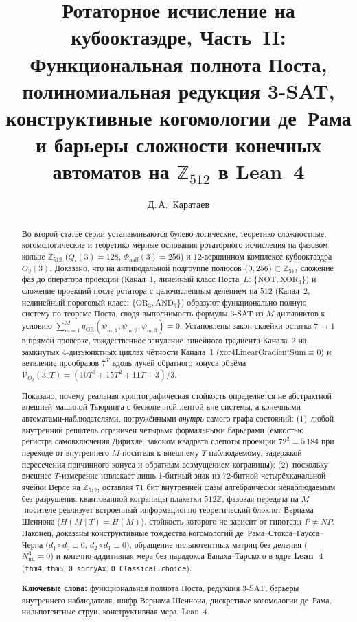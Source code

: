 \documentclass[11pt,a4paper]{article}
\title{\textbf{Ротаторное исчисление на кубооктаэдре, Часть~II:\\ Функциональная полнота Поста, полиномиальная редукция 3-SAT, конструктивные когомологии де~Рама и барьеры сложности конечных автоматов на $\mathbb{Z}_{512}$ в Lean~4}}
\author{Д.\,А.~Каратаев}
\date{}
\theoremstyle{plain}
\theoremstyle{definition}
\begin{document}
\maketitle

\begin{abstract}
Во второй статье серии устанавливаются булево-логические, теоретико-сложностные, когомологические и теоретико-мерные основания ротаторного исчисления на фазовом кольце $\mathbb{Z}_{512}$ ($Q_\square(3)=128$, $\Phi_{\mathrm{half}}(3)=256$) и $12$-вершинном комплексе кубооктаэдра $O_2(3)$. Доказано, что на антиподальной подгруппе полюсов $\{0,256\}\subset\mathbb{Z}_{512}$ сложение фаз до оператора проекции (Канал~1, линейный класс Поста~$L$: $\{\mathrm{NOT},\mathrm{XOR}_3\}$) и сложение проекций после ротатора с целочисленным делением на $512$ (Канал~2, нелинейный пороговый класс: $\{\mathrm{OR}_3,\mathrm{AND}_3\}$) образуют функционально полную систему по теореме Поста, сводя выполнимость формулы 3-SAT из $M$ дизъюнктов к условию $\sum_{m=1}^M q_{\mathrm{OR}}(\psi_{m,1},\psi_{m,2},\psi_{m,3}) = 0$. Установлены закон склейки остатка $7\to 1$ в прямой проверке, тождественное зануление линейного градиента Канала~2 на замкнутых $4$-дизъюнктных циклах чётности Канала~1 ($\mathrm{xor4LinearGradientSum}\equiv 0$) и ветвление прообразов $7^T$ вдоль лучей обратного конуса объёма $\mathcal{V}_{O_2}(3,T) = (10T^3+15T^2+11T+3)/3$.

Показано, почему реальная криптографическая стойкость определяется не абстрактной внешней машиной Тьюринга с бесконечной лентой вне системы, а конечными автоматами-наблюдателями, погружёнными \emph{внутрь} самого графа состояний: (1)~любой внутренний решатель ограничен четырьмя формальными барьерами (ёмкостью регистра самовключения Дирихле, законом квадрата слепоты проекции $72^2 = 5\,184$ при переходе от внутреннего $M$-носителя к внешнему $T$-наблюдаемому, задержкой пересечения причинного конуса и обратным возмущением кограницы); (2)~поскольку внешнее $T$-измерение извлекает лишь $1$-битный знак из $72$-битной четырёхканальной ячейки Верле на $\mathbb{Z}_{512}$, оставляя $71$ бит внутренней фазы алгебраически ненаблюдаемым без разрушения квантованной кограницы плакетки $512\mathbb{Z}$, фазовая передача на $M$-носителе реализует встроенный информационно-теоретический блокнот Вернама Шеннона ($H(M\mid T)=H(M)$), стойкость которого не зависит от гипотезы $P\ne NP$. Наконец, доказаны конструктивные тождества когомологий де~Рама--Стокса--Гаусса--Черна ($d_1\circ d_0\equiv 0$, $d_2\circ d_1\equiv 0$), обращение нильпотентных матриц без деления ($N_{\mathrm{nil}}^3=0$) и конечно-аддитивная мера без парадокса Банаха--Тарского в ядре \textbf{Lean~4} (\texttt{thm4}, \texttt{thm5}, \texttt{0 sorryAx}, \texttt{0 Classical.choice}).

\medskip\noindent
\textbf{Ключевые слова:} функциональная полнота Поста, редукция 3-SAT, барьеры внутреннего наблюдателя, шифр Вернама Шеннона, дискретные когомологии де~Рама, нильпотентные струи, конструктивная мера, Lean~4.
\end{abstract}
\end{document}
